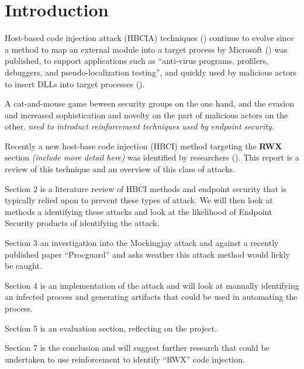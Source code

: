 \section{Introduction}

Host-based code injection attack (HBCIA) techniques (\cite{6999410}) continue to evolve since a method to map an external module into a target process by Microsoft (\cite{Ghizzoni:2004}) was published, to support applications such as ``anti-virus programs, profilers, debuggers, and pseudo-localization testing'', and quickly used by malicious actors to insert DLLs into target processes (\cite{4420399}).

A cat-and-mouse game beween security groups on the one hand, and the evasion and increased sophistication and novelty on the part of malicious actors on the other.  \textit{need to introduct reinforcement techniques used by endpoint security.} 

Recently a new host-base code injection (HBCI) method targeting the \textbf{RWX} section \textit{(include more detail here)} was identified by researchers (\cite{Peixoto:2023}).  This report is a review of this technique and an overview of this class of attacks.

Section 2 is a literature review of HBCI methods and endpoint security that is typically relied upon to prevent these types of attack.  We will then look at methods a identifying these attacks and look at the likelihood of Endpoint Security products of identifying the attack.

Section 3 an investigation into the Mockingjay attack and against a recently published paper ``Procguard'' \cite{10063560} and asks weather this attack method would lickly be caught.


Section 4 is an implementation of the attack and will look at manually identifying an infected process and generating artifacts that could be used in automating the process.

Section 5 is an evaluation section, reflecting on the project.

Section 7 is the conclusion and will suggest further research that could be undertaken to use reinforcement to identify ``RWX'' code injection.
